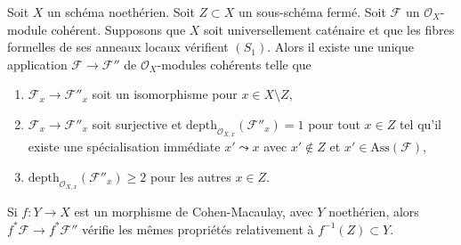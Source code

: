 \begin{lemma}
\label{lemma-make-S2-along-Z}
Soit $X$ un schéma noethérien. Soit $Z \subset X$ un sous-schéma fermé. Soit $\mathcal{F}$ un $\mathcal{O}_X$-module cohérent. Supposons que $X$ soit universellement caténaire et que les fibres formelles de ses anneaux locaux vérifient $(S_1)$. Alors il existe une unique application $\mathcal{F} \to \mathcal{F}''$ de $\mathcal{O}_X$-modules cohérents telle que
\begin{enumerate}
\item $\mathcal{F}_x \to \mathcal{F}''_x$ soit un isomorphisme pour $x \in X \setminus Z$,
\item $\mathcal{F}_x \to \mathcal{F}''_x$ soit surjective et $\text{depth}_{\mathcal{O}_{X, x}}(\mathcal{F}''_x) = 1$ pour tout $x \in Z$ tel qu'il existe une spécialisation immédiate $x' \leadsto x$ avec $x' \not \in Z$ et $x' \in \text{Ass}(\mathcal{F})$,
\item $\text{depth}_{\mathcal{O}_{X, x}}(\mathcal{F}''_x) \geq 2$ pour les autres $x \in Z$.
\end{enumerate}
Si $f : Y \to X$ est un morphisme de Cohen-Macaulay, avec $Y$ noethérien, alors $f^*\mathcal{F} \to f^*\mathcal{F}''$ vérifie les mêmes propriétés relativement à $f^{-1}(Z) \subset Y$.
\end{lemma}


